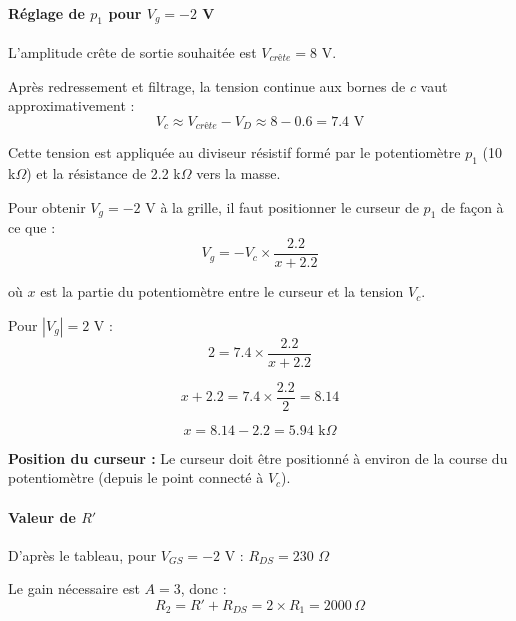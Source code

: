 \documentclass[11pt,a4paper]{article}
\begin{document}
\paragraph{Réglage de $p_1$ pour $V_g = -2$ V}

L'amplitude crête de sortie souhaitée est $V_{crête} = 8$ V.

Après redressement et filtrage, la tension continue aux bornes de $c$ vaut approximativement :
\begin{equation}
V_c \approx V_{crête} - V_D \approx 8 - 0.6 = 7.4 \text{ V}
\end{equation}

Cette tension est appliquée au diviseur résistif formé par le potentiomètre $p_1$ (10 k$\Omega$) et la résistance de 2.2 k$\Omega$ vers la masse.

Pour obtenir $V_g = -2$ V à la grille, il faut positionner le curseur de $p_1$ de façon à ce que :
\begin{equation}
V_g = -V_c \times \frac{2.2}{x + 2.2}
\end{equation}

où $x$ est la partie du potentiomètre entre le curseur et la tension $V_c$.

Pour $|V_g| = 2$ V :
\begin{equation}
2 = 7.4 \times \frac{2.2}{x + 2.2}
\end{equation}

\begin{equation}
x + 2.2 = 7.4 \times \frac{2.2}{2} = 8.14
\end{equation}

\begin{equation}
x = 8.14 - 2.2 = 5.94 \text{ k}\Omega
\end{equation}

\textbf{Position du curseur :} Le curseur doit être positionné à environ  de la course du potentiomètre (depuis le point connecté à $V_c$).

\paragraph{Valeur de $R'$}

D'après le tableau, pour $V_{GS} = -2$ V : $R_{DS} = 230$ $\Omega$

Le gain nécessaire est $A = 3$, donc :
\begin{equation}
R_2 = R' + R_{DS} = 2 \times R_1 = 2000 \, \Omega
\end{equation}
\end{document}
